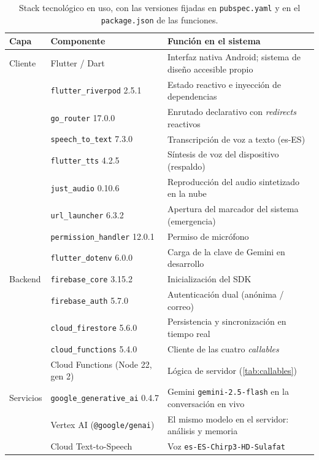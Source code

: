 \begin{table}[htbp]
    \centering
    \begin{tabularx}{\textwidth}{@{}l l >{\RaggedRight\arraybackslash}X@{}}
        \toprule
        \textbf{Capa} & \textbf{Componente} & \textbf{Función en el sistema} \\
        \midrule
        Cliente     & Flutter / Dart               & Interfaz nativa Android; sistema de diseño accesible propio \\
                    & \texttt{flutter\_riverpod} 2.5.1 & Estado reactivo e inyección de dependencias \\
                    & \texttt{go\_router} 17.0.0   & Enrutado declarativo con \emph{redirects} reactivos \\
                    & \texttt{speech\_to\_text} 7.3.0 & Transcripción de voz a texto (es-ES) \\
                    & \texttt{flutter\_tts} 4.2.5  & Síntesis de voz del dispositivo (respaldo) \\
                    & \texttt{just\_audio} 0.10.6  & Reproducción del audio sintetizado en la nube \\
                    & \texttt{url\_launcher} 6.3.2 & Apertura del marcador del sistema (emergencia) \\
                    & \texttt{permission\_handler} 12.0.1 & Permiso de micrófono \\
                    & \texttt{flutter\_dotenv} 6.0.0 & Carga de la clave de Gemini en desarrollo \\
        \midrule
        Backend     & \texttt{firebase\_core} 3.15.2 & Inicialización del SDK \\
                    & \texttt{firebase\_auth} 5.7.0  & Autenticación dual (anónima / correo) \\
                    & \texttt{cloud\_firestore} 5.6.0 & Persistencia y sincronización en tiempo real \\
                    & \texttt{cloud\_functions} 5.4.0 & Cliente de las cuatro \emph{callables} \\
                    & Cloud Functions (Node 22, gen 2) & Lógica de servidor (\autoref{tab:callables}) \\
        \midrule
        Servicios   & \texttt{google\_generative\_ai} 0.4.7 & Gemini \texttt{gemini-2.5-flash} en la conversación en vivo \\
                    & Vertex AI (\texttt{@google/genai}) & El mismo modelo en el servidor: análisis y memoria \\
                    & Cloud Text-to-Speech           & Voz \texttt{es-ES-Chirp3-HD-Sulafat} \\
        \bottomrule
    \end{tabularx}
    \caption{Stack tecnológico en uso, con las versiones fijadas en \texttt{pubspec.yaml} y en el
    \texttt{package.json} de las funciones.}
    \label{tab:stack}
\end{table}

